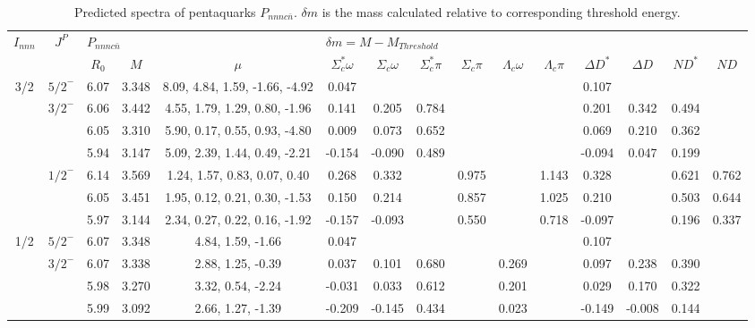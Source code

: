 \documentclass[prd,twocolumn,floatfix,nofootinbib]{revtex4}
\begin{document}
\renewcommand{\tabcolsep}{0.1cm}
\renewcommand{\arraystretch}{1.0}
\begin{table*}[!htbp]
    \caption{Predicted spectra of pentaquarks $P_{nnnc\bar{n}}$.
        $\delta m$ is the mass calculated relative to corresponding threshold energy.}
    \label{tab:nnncn}
    \begin{tabular}{cc|ccc|cccccccccc}
        \bottomrule[1.5pt]\bottomrule[0.5pt]
        \multirow{2}{*}{$I_{nnn}$} &\multirow{2}{*}{$J^{P}$} 
        &\multicolumn{3}{l|}{$P_{nnnc\bar{n}}$} 
        &\multicolumn{10}{l}{$\delta m=M-M_{Threshold}$} \\
        & &$R_{0}$ &$M$ &$\mu$ 
        &$\Sigma_{c}^{\ast}\omega$ &$\Sigma_{c}\omega$ &$\Sigma_{c}^{\ast}\pi$ &$\Sigma_{c}\pi$ &$\Lambda_{c}\omega$ &$\Lambda_{c}\pi$ 
        &$\Delta D^{\ast}$ &$\Delta D$ &$ND^{\ast}$ &$ND$ \\ \hline
        3/2
            &${5/2}^{-}$    &6.07   &3.348  &8.09, 4.84, 1.59, -1.66, -4.92 &0.047 & & & & & &0.107 & & & \\
            &${3/2}^{-}$    &6.06   &3.442  &4.55, 1.79, 1.29, 0.80, -1.96 &0.141 &0.205 &0.784 & & & &0.201 &0.342 &0.494 & \\
            &               &6.05   &3.310  &5.90, 0.17, 0.55, 0.93, -4.80 &0.009 &0.073 &0.652 & & & &0.069 &0.210 &0.362 & \\
            &               &5.94   &3.147  &5.09, 2.39, 1.44, 0.49, -2.21 &-0.154 &-0.090 &0.489 & & & &-0.094 &0.047 &0.199 & \\
            &${1/2}^{-}$    &6.14   &3.569  &1.24, 1.57, 0.83, 0.07, 0.40 &0.268 &0.332 & &0.975 & &1.143 &0.328 & &0.621 &0.762 \\
            &               &6.05   &3.451  &1.95, 0.12, 0.21, 0.30, -1.53 &0.150 &0.214 & &0.857 & &1.025 &0.210 & &0.503 &0.644 \\
            &               &5.97   &3.144  &2.34, 0.27, 0.22, 0.16, -1.92 &-0.157 &-0.093 & &0.550 & &0.718 &-0.097 & &0.196 &0.337 \\
        1/2
            &${5/2}^{-}$    &6.07   &3.348  &4.84, 1.59, -1.66 &0.047 & & & & & &0.107 & & & \\
            &${3/2}^{-}$    &6.07   &3.338  &2.88, 1.25, -0.39 &0.037 &0.101 &0.680 & &0.269 & &0.097 &0.238 &0.390 & \\
            &               &5.98   &3.270  &3.32, 0.54, -2.24 &-0.031 &0.033 &0.612 & &0.201 & &0.029 &0.170 &0.322 & \\
            &               &5.99   &3.092  &2.66, 1.27, -1.39 &-0.209 &-0.145 &0.434 & &0.023 & &-0.149 &-0.008 &0.144 & \\

\end{tabular}
\end{table*}
\end{document}
